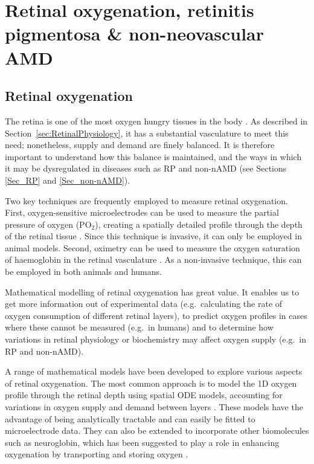 \documentclass{article}
\begin{document}
\section{Retinal oxygenation, retinitis pigmentosa \& non-neovascular AMD}\label{Sec_Ox_RP_non-nAMD}
%
%
\subsection{Retinal oxygenation}\label{Sec_Oxygen}
%
The retina is one of the most oxygen hungry tissues in the body \citep[per gram of tissue][]{Anderson_1968,Anderson_and_Saltzman_1964,Yu_and_Cringle_2001,W-Wirawan_and_Linsenmeier_2003}. As described in Section~\ref{sec:RetinalPhysiology}, it has a substantial vasculature to meet this need; nonetheless, supply and demand are finely balanced. It is therefore important to understand how this balance is maintained, and the ways in which it may be dysregulated in diseases such as RP and non-nAMD (see Sections \ref{Sec_RP} and \ref{Sec_non-nAMD}).

Two key techniques are frequently employed to measure retinal oxygenation. First, oxygen-sensitive microelectrodes can be used to measure the partial pressure of oxygen (PO$_2$), creating a spatially detailed profile through the depth of the retinal tissue \citep{Linsenmeier_and_Zhang_2017}. Since this technique is invasive, it can only be employed in animal models. Second, oximetry can be used to measure the oxygen saturation of haemoglobin in the retinal vasculature \citep{Linsenmeier_and_Zhang_2017}. As a non-invasive technique, this can be employed in both animals and humans.

Mathematical modelling of retinal oxygenation has great value. It enables us to get more information out of experimental data (e.g.\ calculating the rate of oxygen consumption of different retinal layers), to predict oxygen profiles in cases where these cannot be measured (e.g.\ in humans) and to determine how variations in retinal physiology or biochemistry may affect oxygen supply (e.g.\ in RP and non-nAMD).

A range of mathematical models have been developed to explore various aspects of retinal oxygenation. The most common approach is to model the 1D oxygen profile through the retinal depth using spatial ODE models, accounting for variations in oxygen supply and demand between layers \citep[utilising anywhere between 1 and 8 model layers][]{Braun_et_al_1995,Cringle_and_Yu_2002,Dollery_et_al_1969,Haugh_et_al_1990,Linsenmeier_1986,Stefansson_1988}. These models have the advantage of being analytically tractable and can easily be fitted to microelectrode data. They can also be extended to incorporate other biomolecules such as neuroglobin, which has been suggested to play a role in enhancing oxygenation by transporting and storing oxygen \citep{Fago_et_al_2004_b,Roberts_et_al_2016a}.
\end{document}
